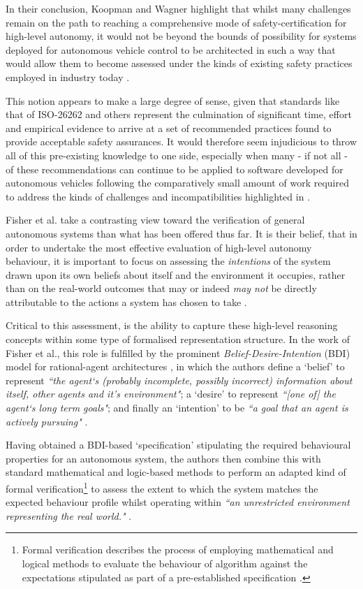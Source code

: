 \documentclass[conference]{IEEEtran}
\begin{document}
In their conclusion, Koopman and Wagner highlight that whilst many challenges remain on the path to reaching a comprehensive mode of safety-certification for high-level autonomy, it would not be beyond the bounds of possibility for systems deployed for autonomous vehicle control to be architected in such a way that would allow them to become assessed under the kinds of existing safety practices employed in industry today \cite{wagner-2}. 

This notion appears to make a large degree of sense, given that standards like that of ISO-26262 and others represent the culmination of significant time, effort and empirical evidence to arrive at a set of recommended practices found to provide acceptable safety assurances. It would therefore seem injudicious to throw all of this pre-existing knowledge to one side, especially when many - if not all - of these recommendations can continue to be applied to software developed for autonomous vehicles following the comparatively small amount of work required to address the kinds of challenges and incompatibilities highlighted in \cite{wagner-2}. 

Fisher et al. take a contrasting view toward the verification of general autonomous systems than what has been offered thus far. It is their belief, that in order to undertake the most effective evaluation of high-level autonomy behaviour, it is important to focus on assessing the \textit{intentions} of the system drawn upon its own beliefs about itself and the environment it occupies, rather than on the real-world outcomes that may or indeed \textit{may not} be directly attributable to the actions a system has chosen to take \cite{fisher-1}. 

Critical to this assessment, is the ability to capture these high-level reasoning concepts within some type of formalised representation structure. In the work of Fisher et al., this role is fulfilled by the prominent \textit{Belief-Desire-Intention} (BDI) model for rational-agent architectures \cite{bdi}, in which the authors define a `belief' to represent \textit{``the agent`s (probably incomplete, possibly incorrect) information about itself, other agents and it's environment"}; a `desire' to represent \textit{``[one of] the agent`s long term goals"}; and finally an `intention' to be \textit{``a goal that an agent is actively pursuing"} \cite{fisher-1}. 

Having obtained a BDI-based `specification' stipulating the required behavioural properties for an autonomous system, the authors then combine this with standard mathematical and logic-based methods to perform an adapted kind of formal verification\footnote{Formal verification describes the process of employing mathematical and logical methods to evaluate the behaviour of algorithm against the expectations stipulated as part of a pre-established specification \cite{fisher-1}.} to assess the extent to which the system matches the expected behaviour profile whilst operating within \textit{``an unrestricted environment representing the real world."} \cite{fisher-1}.
\end{document}

